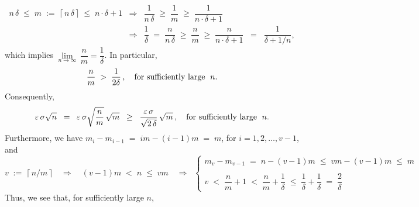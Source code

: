 \begin{eqnarray*}
n\,\delta \;\leq\; m \;:=\; \lceil\,n\,\delta\,\rceil \;\leq\; n\cdot\delta + 1
&\Longrightarrow&
	\dfrac{1}{n\,\delta} \;\geq\; \dfrac{1}{m} \;\geq\; \dfrac{1}{n\cdot\delta + 1}
\\
&\Longrightarrow&
	\dfrac{1}{\delta} \;=\; \dfrac{n}{n\,\delta} \;\geq\; \dfrac{n}{m} \;\geq\; \dfrac{n}{n\cdot\delta + 1}
	\;\;=\;\; \dfrac{1}{\delta + 1/n},
\end{eqnarray*}
which implies $\underset{n\rightarrow\infty}{\lim}\,\dfrac{n}{m} = \dfrac{1}{\delta}$.
In particular,
\begin{eqnarray*}
	\dfrac{n}{m} \;>\; \dfrac{1}{2\delta}\,,
	\quad\textnormal{for sufficiently large \;$n$}.
\end{eqnarray*}
Consequently,
\begin{equation*}
\varepsilon\,\sigma\sqrt{n}
\;\; = \;\;
	\varepsilon\,\sigma\sqrt{\dfrac{n}{m}}\,\sqrt{m}
\;\; \geq \;\;
	\dfrac{\varepsilon\,\sigma}{\sqrt{2\,\delta}}\,\sqrt{m}\,,
	\quad\textnormal{for sufficiently large \;$n$}.
\end{equation*}
Furthermore, we have
\;$m_{i} - m_{i-1} \;=\; im - (i-1)m \;=\; m$,\; for $i = 1, 2, \ldots, v-1$,\; and
\begin{equation*}
v \;:=\; \lceil\,n/m\,\rceil
\quad\Longrightarrow\quad
	(v-1)m \;<\; n \;\leq\; vm
\quad\Longrightarrow\;\;
	\left\{\begin{array}{l}
		m_{v} - m_{v-1} \;=\; n - (v-1)m \;\leq\; vm - (v-1)m \;\leq\; m
		\\ \\
		v \;<\; \dfrac{n}{m} + 1 \;<\; \dfrac{n}{m} + \dfrac{1}{\delta} \;\leq\; \dfrac{1}{\delta} + \dfrac{1}{\delta} \;=\; \dfrac{2}{\delta}
	\end{array}\right.
\end{equation*}
Thus, we see that, for sufficiently large $n$,
